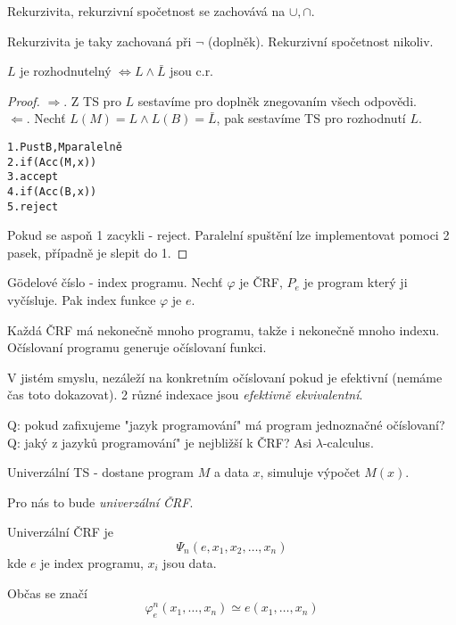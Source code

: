\begin{reminder}
	Rekurzivita, rekurzivní spočetnost se zachovává na $\cup, \cap$.

	Rekurzivita je taky zachovaná při $\neg$ (doplněk).
	Rekurzivní spočetnost nikoliv.
\end{reminder}

\begin{theorem}[Postova]\label{post}
	$L$ je rozhodnutelný $ \iff L \land \bar{L} $ jsou c.r.
\end{theorem}
\begin{proof}
$ \Rightarrow $. Z TS pro $L$ sestavíme pro doplněk znegovaním všech odpovědi. \\
$ \Leftarrow $. Nechť $L(M) = L \land L(B) = \bar{L} $, pak sestavíme TS pro rozhodnutí $L$.

\begin{alltt}
1. Pust B, M paralelně
2. if(Acc(M, x))
3. \tab accept
4. if(Acc(B, x))
5. reject
\end{alltt}

Pokud se aspoň 1 zacykli - reject. Paralelní spuštění lze implementovat pomoci 2 pasek, případně je slepit do 1.
\end{proof}

\begin{definition}
	G\"{o}delové číslo - index programu.
	Nechť $\varphi$ je ČRF, $P_e$ je program který ji vyčísluje.
	Pak index funkce $\varphi$ je $e$.
\end{definition}

\begin{note}
	Každá ČRF má nekonečně mnoho programu, takže i nekonečně mnoho indexu.
	Očíslovaní programu generuje očíslovaní funkci.

	V jistém smyslu, nezáleží na konkretním očíslovaní pokud je efektivní (nemáme čas toto dokazovat).
	2 různé indexace jsou \emph{efektivně ekvivalentní}.
\end{note}

Q: pokud zafixujeme "jazyk programování" má program jednoznačné očíslovaní?
Q: jaký z jazyků programování" je nejbližší k ČRF? Asi $\lambda$-calculus.

\begin{reminder}
	Univerzální TS - dostane program $M$ a data $x$, simuluje výpočet $M(x)$.

	Pro nás to bude \emph{univerzální ČRF}.
\end{reminder}

\begin{definition}
	Univerzální ČRF je
	\[ \Psi_n(e, x_1, x_2, \ldots, x_n) \]
	kde $e$ je index programu, $x_i$ jsou data.

	Občas se značí
	\[ \varphi_e^n(x_1, \ldots, x_n) \simeq {e}(x_1, \ldots, x_n) \]
\end{definition}

